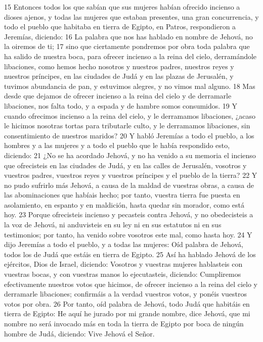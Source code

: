 15 Entonces todos los que sabían que sus mujeres habían ofrecido incienso a dioses ajenos, y todas las mujeres que estaban presentes, una gran concurrencia, y todo el pueblo que habitaba en tierra de Egipto, en Patros, respondieron a Jeremías, diciendo:
16 La palabra que nos has hablado en nombre de Jehová, no la oiremos de ti;
17 sino que ciertamente pondremos por obra toda palabra que ha salido de nuestra boca, para ofrecer incienso a la reina del cielo, derramándole libaciones, como hemos hecho nosotros y nuestros padres, nuestros reyes y nuestros príncipes, en las ciudades de Judá y en las plazas de Jerusalén, y tuvimos abundancia de pan, y estuvimos alegres, y no vimos mal alguno.
18 Mas desde que dejamos de ofrecer incienso a la reina del cielo y de derramarle libaciones, nos falta todo, y a espada y de hambre somos consumidos.
19 Y cuando ofrecimos incienso a la reina del cielo, y le derramamos libaciones, ¿acaso le hicimos nosotras tortas para tributarle culto, y le derramamos libaciones, sin consentimiento de nuestros maridos?
20 Y habló Jeremías a todo el pueblo, a los hombres y a las mujeres y a todo el pueblo que le había respondido esto, diciendo:
21 ¿No se ha acordado Jehová, y no ha venido a su memoria el incienso que ofrecisteis en las ciudades de Judá, y en las calles de Jerusalén, vosotros y vuestros padres, vuestros reyes y vuestros príncipes y el pueblo de la tierra?
22 Y no pudo sufrirlo más Jehová, a causa de la maldad de vuestras obras, a causa de las abominaciones que habíais hecho; por tanto, vuestra tierra fue puesta en asolamiento, en espanto y en maldición, hasta quedar sin morador, como está hoy.
23 Porque ofrecisteis incienso y pecasteis contra Jehová, y no obedecisteis a la voz de Jehová, ni anduvisteis en su ley ni en sus estatutos ni en sus testimonios; por tanto, ha venido sobre vosotros este mal, como hasta hoy.
24 Y dijo Jeremías a todo el pueblo, y a todas las mujeres: Oíd palabra de Jehová, todos los de Judá que estáis en tierra de Egipto.
25 Así ha hablado Jehová de los ejércitos, Dios de Israel, diciendo: Vosotros y vuestras mujeres hablasteis con vuestras bocas, y con vuestras manos lo ejecutasteis, diciendo: Cumpliremos efectivamente nuestros votos que hicimos, de ofrecer incienso a la reina del cielo y derramarle libaciones; confirmáis a la verdad vuestros votos, y ponéis vuestros votos por obra.
26 Por tanto, oíd palabra de Jehová, todo Judá que habitáis en tierra de Egipto: He aquí he jurado por mi grande nombre, dice Jehová, que mi nombre no será invocado más en toda la tierra de Egipto por boca de ningún hombre de Judá, diciendo: Vive Jehová el Señor.
